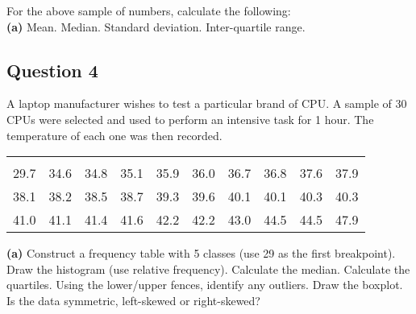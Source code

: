 \documentclass[12pt]{article}
\begin{document}
For the above sample of numbers, calculate the following:\\[0.2cm]
{\bf(a)} Mean.  Median.  Standard deviation.  Inter-quartile range.




\subsection*{Question 4}
A laptop manufacturer wishes to test a particular brand of CPU. A sample of 30 CPUs were selected and used to perform an intensive task for 1 hour. The temperature of each one was then recorded.
\begin{center}
\begin{tabular}{|cccccccccc|}
\hline
&&&&&&&&&\\[-0.4cm]
29.7 & 34.6 & 34.8 & 35.1 & 35.9 & 36.0 & 36.7 & 36.8 & 37.6 & 37.9\\
38.1 & 38.2 & 38.5 & 38.7 & 39.3 & 39.6 & 40.1 & 40.1 & 40.3 & 40.3\\
41.0 & 41.1 & 41.4 & 41.6 & 42.2 & 42.2 & 43.0 & 44.5 & 44.5 & 47.9 \\
\hline
\end{tabular}
\end{center}

{\bf(a)} Construct a frequency table with 5 classes (use 29 as the first breakpoint).  Draw the histogram (use relative frequency).  Calculate the median.  Calculate the quartiles.  Using the lower/upper fences, identify any outliers.  Draw the boxplot.  Is the data symmetric, left-skewed or right-skewed?
\end{document}

